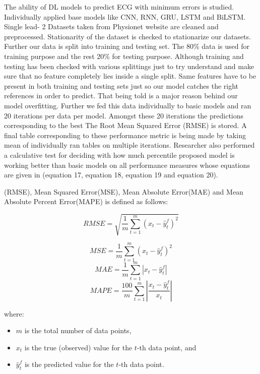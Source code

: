 The ability of DL models to predict ECG with minimum errors is studied. Individually applied base models like CNN, RNN, GRU, LSTM and BiLSTM. Single lead- 2  Datasets taken from Physionet website are cleaned and preprocessed. Stationarity of the dataset is checked to stationarize our datasets. Further our data is split into training and testing set. The 80\% data is used for training purpose and the rest 20\% for testing purpose. Although training and testing has been checked with various splittings just to try understand and make sure that no feature completely lies inside a single split. Same features have to be present in both training and testing sets just so our model catches the right references in order to predict. That being told is a major reason behind our model overfitting.
Further we fed this data individually to basic models and ran 20 iterations per data per model. Amongst these 20 iterations the predictions corresponding to the best The Root Mean Squared Error (RMSE) is stored. A final table corresponding to these performance metric is being made by taking mean of individually ran tables on multiple iterations. Researcher also performed a calculative test for deciding with how much percentile  proposed model is working better than basic models on all performance measures whose equations are given in (equation 17, equation 18, equation 19 and equation 20).


(RMSE),  Mean Squared Error(MSE),  Mean Absolute Error(MAE) and Mean Absolute Percent Error(MAPE) is defined as follows:

\begin{equation}
  {RMSE} = \sqrt{\frac{1}{m}\sum_{t=1}^{m}(x_t - \hat{y}_{t}^f)^2}
\end{equation}

\begin{equation}
  {MSE} = \frac{1}{m} \sum_{t=1}^{m} (x_t - \hat{y}_{t}^f)^2
\end{equation}
\begin{equation}
  {MAE} = \frac{1}{m} \sum_{t=1}^{m} \left|x_t - \hat{y}_{t}^f\right|
\end{equation}
\begin{equation}
  {MAPE} =\frac{100}{m} \sum_{t=1}^{m} \left| \frac{x_t - \hat{y}_{t}^f}{x_t} \right|
\end{equation}

where:
\begin{itemize}
  \item $m$ is the total number of data points, 
  \item $x_t$ is the true (observed) value for the $t$-th data point,  and
  \item $\hat{y}_{t}^f$ is the predicted value for the $t$-th data point.
\end{itemize}


